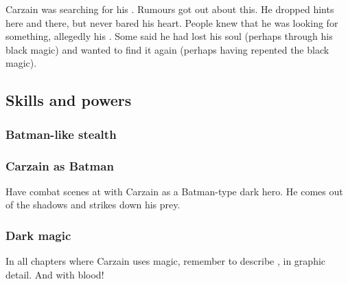 Carzain was searching for his .
Rumours got out about this. 
He dropped hints here and there, but never bared his heart. 
People knew that he was looking for something, allegedly his . 
Some said he had lost his soul (perhaps through his black magic) and wanted to find it again (perhaps having repented the black magic). 









\subsection{Skills and powers}





\subsubsection{Batman-like stealth}






\subsubsection{Carzain as Batman}
Have combat scenes at \Forclin with Carzain as a Batman-type dark hero. 
He comes out of the shadows and strikes down his prey. 





\subsubsection{Dark magic}
In all chapters where Carzain uses magic, remember to describe , in graphic detail. 
And with blood! 

